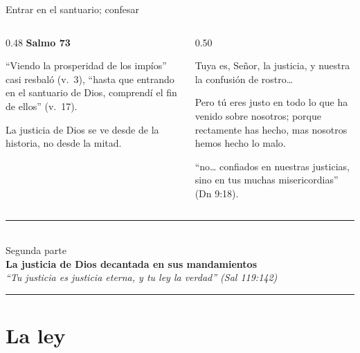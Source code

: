 \begin{frame}{Entrar en el santuario; confesar}
\begin{columns}[t,onlytextwidth]
\begin{column}{0.48\textwidth}
\textbf{\color{azul}Salmo 73}\par\small
``Viendo la prosperidad de los impíos'' casi resbaló (v.~3), ``hasta que entrando en el santuario de Dios, comprendí el fin de ellos'' (v.~17).\par\medskip
La justicia de Dios se ve desde  de la historia, no desde la mitad.
\end{column}
\begin{column}{0.50\textwidth}
\begin{cita}Tuya es, Señor, la justicia, y nuestra la confusión de rostro\ldots{}\end{cita}
\begin{cita}Pero tú eres justo en todo lo que ha venido sobre nosotros; porque rectamente has hecho, mas nosotros hemos hecho lo malo.\end{cita}
\scriptsize ``no\ldots{} confiados en nuestras justicias, sino en tus muchas misericordias'' (Dn 9:18).
\end{column}
\end{columns}
\end{frame}

\begin{frame}[plain]
\vfill\centering
{\color{dorado}\rule{0.55\linewidth}{1.2pt}}\\[8pt]
{\large\color{gris}Segunda parte}\\[4pt]
{\LARGE\bfseries\color{azul}La justicia de Dios decantada en sus mandamientos}\\[8pt]
{\small\itshape\color{gris}``Tu justicia es justicia eterna, y tu ley la verdad'' (Sal 119:142)}\\[8pt]
{\color{dorado}\rule{0.55\linewidth}{1.2pt}}
\vfill
\end{frame}

\section{La ley}

